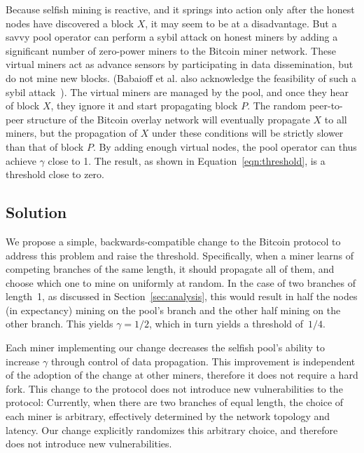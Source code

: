 \documentclass[letterpaper]{llncs}
\newcommand{\negspace}{\vspace{-0.5\baselineskip}}
\begin{document}
Because selfish mining is reactive, and it springs into action only after the honest nodes have discovered a block $X$, it may seem to be at a disadvantage. But a savvy pool operator can perform a sybil attack on honest miners by adding a significant number of zero-power miners to the Bitcoin miner network. These virtual miners act as advance sensors by participating in data dissemination, but do not mine new blocks. (Babaioff et al. also acknowledge the feasibility of such a sybil attack~\cite{babaioff2012baloons}). The virtual miners are managed by the pool, and once they hear of block $X$, they ignore it and start propagating block $P$. The random peer-to-peer structure of the Bitcoin overlay network will eventually propagate $X$ to all miners, but the propagation of $X$ under these conditions will be strictly slower than that of block $P$. By adding enough virtual nodes, the pool operator can thus achieve $\gamma$ close to 1. The result, as shown in Equation~\ref{eqn:threshold}, is a threshold close to zero. 

        \subsection{Solution}
        \negspace

We propose a simple, backwards-compatible change to the Bitcoin protocol to address this problem and raise the threshold. 
Specifically, when a miner learns of competing branches of the same length, it should propagate all of them, and choose which one to mine on uniformly at random. 
In the case of two branches of length~1, as discussed in Section~\ref{sec:analysis}, this would result in half the nodes (in expectancy) mining on the pool's branch and the other half mining on the other branch. This yields $\gamma = 1/2$, which in turn yields a threshold of~$1/4$. 

Each miner implementing our change decreases the selfish pool's ability to increase $\gamma$ through control of data propagation. This improvement is independent of the adoption of the change at other miners, therefore it does not require a hard fork. 
This change to the protocol does not introduce new vulnerabilities to the protocol: 
Currently, when there are two branches of equal length, the choice of each miner is arbitrary, effectively determined by the network topology and latency. 
Our change explicitly randomizes this arbitrary choice, and therefore does not introduce new vulnerabilities. 
\end{document}
